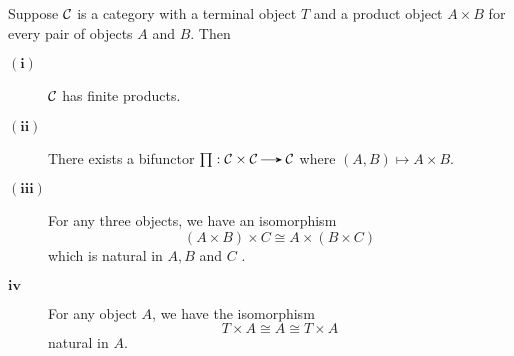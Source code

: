 \begin{proposition}\label{prop_category_finite_products}
    Suppose $\mathcal{C}$ is a category with a terminal object $T$ and a product
    object $A \times B$ for every pair of objects $A$ and $B$. Then 
    \begin{description}
        \item[$\bm{(i)}$] $\mathcal{C}$ has finite products. 
        \item[$\bm{(ii)}$] There exists a bifunctor $\prod: \cc \times \cc
        \to \cc$ where $(A, B) \mapsto A \times B$.

        \item[$\bm{(iii)}$] For any three objects, we have an
        isomorphism 
        \[
            (A \times B) \times C \cong A \times (B \times C)
        \]
        which is natural in $A, B$ and $C$ .

        \item[$\bm{iv}$] For any object $A$, we have the isomorphism 
        \[
            T \times A \cong A \cong T \times A            
        \] 
        natural in $A$.
    \end{description}
\end{proposition}

